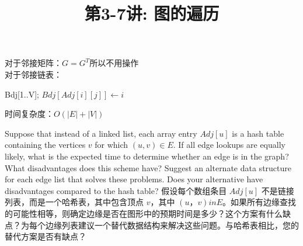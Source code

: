 \documentclass[a4paper, justified]{tufte-handout}
\title{第3-7讲: 图的遍历}
\date{\zhtoday} %
\begin{document}
\maketitle
\noplagiarism %
\begin{abstract}
\end{abstract}
\beginrequired

\begin{problem}[TC 22.1-3]
\end{problem}

\begin{solution}
  对于邻接矩阵：$G = G^T$所以不用操作\\
  对于邻接链表：
  \begin{algorithm}[H]
    \begin{algorithmic}[1]
      \State Bdj[1..V];
      \State $Bdj[Adj[i][j]] \gets i$
      \EndFor
      \EndFor
      \EndProcedure
    \end{algorithmic}
  \end{algorithm}
  时间复杂度：$O(|E|+|V|)$

\end{solution}

\begin{problem}[TC 22.1-8]
Suppose that instead of a linked list, each array entry $Adj[u]$ is a hash table containing the vertices $v$ for which $(u, v) \in E$. If all edge lookups are equally likely, what is the expected time to determine whether an edge is in the graph? What disadvantages does this scheme have? Suggest an alternate data structure for each edge list that solves these problems. Does your alternative have disadvantages compared to the hash table?
假设每个数组条目 $Adj[u]$ 不是链接列表，而是一个哈希表，其中包含顶点 $v$，其中 $(u， v) in E$。如果所有边缘查找的可能性相等，则确定边缘是否在图形中的预期时间是多少？这个方案有什么缺点？为每个边缘列表建议一个替代数据结构来解决这些问题。与哈希表相比，您的替代方案是否有缺点？
\end{problem}
\end{document}

